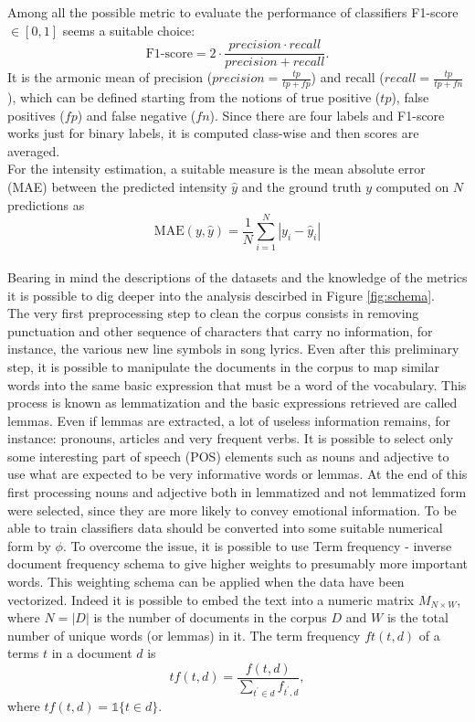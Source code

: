 \documentclass[runningheads]{llncs}
\begin{document}
Among all the possible metric to evaluate the performance of classifiers F1-score $\in [0,1]$ seems a suitable choice:
\begin{equation}
    \text{F1-score} = 2 \cdot  \frac{precision \cdot   recall}{precision + recall}.
\end{equation}
It is the armonic mean of precision ($precision = \frac{tp}{tp+fp}$) and recall ($recall = \frac{tp}{tp+fn}$), which can be defined starting from the notions of true positive ($tp$), false positives ($fp$) and false negative ($fn$).
Since there are four labels and F1-score works just for binary labels, it is computed class-wise and then scores are averaged.\\

For the intensity estimation, a suitable measure is the mean absolute error (MAE) between the predicted intensity $\hat{y}$ and the ground truth $y$ computed on $N$ predictions as
\begin{equation}
    \text{MAE}(y,\hat{y}) = \frac{1}{N} \sum_{i=1}^N |y_i-\hat{y}_i|
\end{equation}
\\

Bearing in mind the descriptions of the datasets and the knowledge of the metrics it is possible to dig deeper into the analysis descirbed in Figure \ref{fig:schema}.\\
The very first preprocessing step to clean the corpus consists in removing punctuation and other sequence of characters that carry no information, for instance, the various new line symbols in song lyrics. Even after this preliminary step, it is possible to manipulate the documents in the corpus to map similar words into the same basic expression that must be a word of the vocabulary. This process is known as lemmatization and the basic expressions retrieved are called lemmas. Even if lemmas are extracted, a lot of useless information remains, for instance: pronouns, articles and very frequent verbs. It is possible to select only some interesting part of speech (POS) elements such as nouns and adjective to use what are expected to be very informative words or lemmas. At the end of this first processing nouns and adjective both in lemmatized and not lemmatized form were selected, since they are more likely to convey emotional information. To be able to train classifiers data should be converted into some suitable numerical form by $\phi$. To overcome the issue, it is possible to use Term frequency - inverse document frequency schema to give higher weights to presumably more important words.
This weighting schema can be applied when the data have been vectorized. Indeed it is possible to embed the text into a numeric matrix $M_{N \times W}$, where $N = |D|$ is the number of documents in the corpus $D$ and $W$ is the total number of unique words (or lemmas) in it.
The term frequency $ft(t,d)$ of a terms $t$ in a document $d$ is 
\begin{equation}
    tf(t,d) = \frac{f(t,d)}{\sum_{t^{\prime} \in d}f_{t^{\prime},d}},
\end{equation}
where $tf(t,d) = \mathds{1}\{t \in d\}$.
\end{document}
